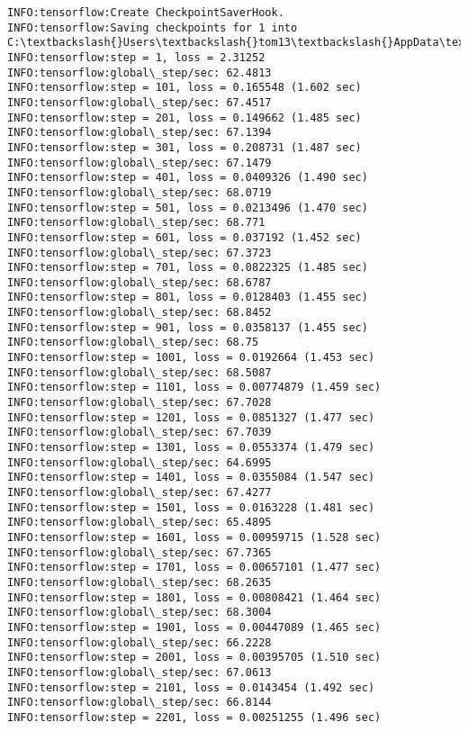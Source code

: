 \documentclass[11pt]{article}
\begin{document}
    \begin{Verbatim}[commandchars=\\\{\}]
INFO:tensorflow:Create CheckpointSaverHook.
INFO:tensorflow:Saving checkpoints for 1 into C:\textbackslash{}Users\textbackslash{}tom13\textbackslash{}AppData\textbackslash{}Local\textbackslash{}Temp\textbackslash{}tmp97az0nju\textbackslash{}model.ckpt.
INFO:tensorflow:step = 1, loss = 2.31252
INFO:tensorflow:global\_step/sec: 62.4813
INFO:tensorflow:step = 101, loss = 0.165548 (1.602 sec)
INFO:tensorflow:global\_step/sec: 67.4517
INFO:tensorflow:step = 201, loss = 0.149662 (1.485 sec)
INFO:tensorflow:global\_step/sec: 67.1394
INFO:tensorflow:step = 301, loss = 0.208731 (1.487 sec)
INFO:tensorflow:global\_step/sec: 67.1479
INFO:tensorflow:step = 401, loss = 0.0409326 (1.490 sec)
INFO:tensorflow:global\_step/sec: 68.0719
INFO:tensorflow:step = 501, loss = 0.0213496 (1.470 sec)
INFO:tensorflow:global\_step/sec: 68.771
INFO:tensorflow:step = 601, loss = 0.037192 (1.452 sec)
INFO:tensorflow:global\_step/sec: 67.3723
INFO:tensorflow:step = 701, loss = 0.0822325 (1.485 sec)
INFO:tensorflow:global\_step/sec: 68.6787
INFO:tensorflow:step = 801, loss = 0.0128403 (1.455 sec)
INFO:tensorflow:global\_step/sec: 68.8452
INFO:tensorflow:step = 901, loss = 0.0358137 (1.455 sec)
INFO:tensorflow:global\_step/sec: 68.75
INFO:tensorflow:step = 1001, loss = 0.0192664 (1.453 sec)
INFO:tensorflow:global\_step/sec: 68.5087
INFO:tensorflow:step = 1101, loss = 0.00774879 (1.459 sec)
INFO:tensorflow:global\_step/sec: 67.7028
INFO:tensorflow:step = 1201, loss = 0.0851327 (1.477 sec)
INFO:tensorflow:global\_step/sec: 67.7039
INFO:tensorflow:step = 1301, loss = 0.0553374 (1.479 sec)
INFO:tensorflow:global\_step/sec: 64.6995
INFO:tensorflow:step = 1401, loss = 0.0355084 (1.547 sec)
INFO:tensorflow:global\_step/sec: 67.4277
INFO:tensorflow:step = 1501, loss = 0.0163228 (1.481 sec)
INFO:tensorflow:global\_step/sec: 65.4895
INFO:tensorflow:step = 1601, loss = 0.00959715 (1.528 sec)
INFO:tensorflow:global\_step/sec: 67.7365
INFO:tensorflow:step = 1701, loss = 0.00657101 (1.477 sec)
INFO:tensorflow:global\_step/sec: 68.2635
INFO:tensorflow:step = 1801, loss = 0.00808421 (1.464 sec)
INFO:tensorflow:global\_step/sec: 68.3004
INFO:tensorflow:step = 1901, loss = 0.00447089 (1.465 sec)
INFO:tensorflow:global\_step/sec: 66.2228
INFO:tensorflow:step = 2001, loss = 0.00395705 (1.510 sec)
INFO:tensorflow:global\_step/sec: 67.0613
INFO:tensorflow:step = 2101, loss = 0.0143454 (1.492 sec)
INFO:tensorflow:global\_step/sec: 66.8144
INFO:tensorflow:step = 2201, loss = 0.00251255 (1.496 sec)

\end{Verbatim}
\end{document}
